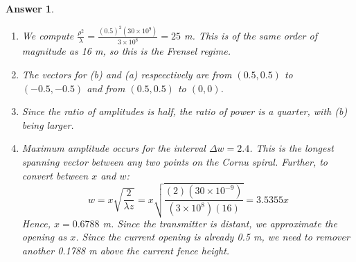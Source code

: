 \documentclass[a4paper]{article}
\newtheorem{ans}{Answer}[subsection]
\theoremstyle{new}
\begin{document}
\begin{ans}
\begin{enumerate}[label=(\roman*)]
$$r^2=L^2+(x_0-x)^2+(y_0-y)^2=D^2\bigg(1-2\frac{x_0x+y_0y}{D^2}+\frac{x^2+y^2}{D^2}\bigg)$$
where $D^2=L^2+x_0^2+y_0^2$. Using binomial expansion, we obtain $r\approx D-\frac{x_0x+y_0y}{D}+\frac{x^2+y^2}{2D}$. Since the phase of each wavelet is directly proportional to $kr$, the phase will have terms which vary linearly and quadratically with the position in the aperture. For large $D$, we obtain the Fraunhofer diffraction condition $\forall x,y\in\Sigma$, where we can drop the quadratic term and left with the linear term. Equivalently, for an aperture of maximum extent $\rho=\sqrt{x^2+y^2}$, the quadratic term for the phase $kr$ must be much less than $\pi$, i.e. $\frac{x^2+y^2}{2D}k<<\pi\implies D>>\frac{\rho^2}{\lambda}$.
\item We compute $\frac{\rho^2}{\lambda}=\frac{(0.5)^2(30\times10^9)}{3\times10^8}=25$ m. This is of the same order of magnitude as 16 m, so this is the Frensel regime.
\item The vectors for (b) and (a) respeectively are from $(0.5,0.5)$ to $(-0.5,-0.5)$ and from $(0.5,0.5)$ to $(0,0)$.
\item Since the ratio of amplitudes is half, the ratio of power is a quarter, with (b) being larger.
\item Maximum amplitude occurs for the interval $\Delta w=2.4$. This is the longest spanning vector between any two points on the Cornu spiral. Further, to convert between $x$ and $w$:
$$w=x\sqrt{\frac{2}{\lambda z}}=x\sqrt{\frac{(2)(30\times10^{-9})}{(3\times10^8)(16)}}=3.5355 x$$
Hence, $x=0.6788$ m. Since the transmitter is distant, we approximate the opening as $x$. Since the current opening is already 0.5 m, we need to remover another 0.1788 m above the current fence height.
\end{enumerate}
\end{ans}
\newpage
\end{document}
